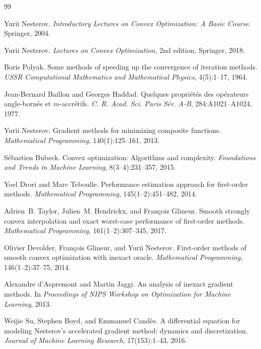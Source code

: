 \documentclass[11pt]{article}
\theoremstyle{plain}
\theoremstyle{remark}
\begin{document}
\begin{thebibliography}{99}

Yurii Nesterov.
\newblock \emph{Introductory Lectures on Convex Optimization: A Basic Course}.
\newblock Springer, 2004.

Yurii Nesterov.
\newblock \emph{Lectures on Convex Optimization}, 2nd edition.
\newblock Springer, 2018.

Boris Polyak.
\newblock Some methods of speeding up the convergence of iteration methods.
\newblock \emph{USSR Computational Mathematics and Mathematical Physics},
  4(5):1--17, 1964.

Jean-Bernard Baillon and Georges Haddad.
\newblock Quelques propri{\'e}t{\'e}s des op{\'e}rateurs angle-born{\'e}s et
  $m$-accr{\'e}tifs.
\newblock \emph{C. R. Acad. Sci. Paris S{\'e}r. A-B}, 284:A1021--A1024, 1977.

Yurii Nesterov.
\newblock Gradient methods for minimizing composite functions.
\newblock \emph{Mathematical Programming}, 140(1):125--161, 2013.

S{\'e}bastien Bubeck.
\newblock Convex optimization: Algorithms and complexity.
\newblock \emph{Foundations and Trends in Machine Learning}, 8(3--4):231--357,
  2015.

Yoel Drori and Marc Teboulle.
\newblock Performance estimation approach for first-order methods.
\newblock \emph{Mathematical Programming}, 145(1--2):451--482, 2014.

Adrien~B. Taylor, Julien~M. Hendrickx, and Fran\c{c}ois Glineur.
\newblock Smooth strongly convex interpolation and exact worst-case performance
  of first-order methods.
\newblock \emph{Mathematical Programming}, 161(1--2):307--345, 2017.

Olivier Devolder, Fran\c{c}ois Glineur, and Yurii Nesterov.
\newblock First-order methods of smooth convex optimization with inexact
  oracle.
\newblock \emph{Mathematical Programming}, 146(1--2):37--75, 2014.

Alexandre d'Aspremont and Martin Jaggi.
\newblock An analysis of inexact gradient methods.
\newblock In \emph{Proceedings of NIPS Workshop on Optimization for Machine
  Learning}, 2013.

Weijie Su, Stephen Boyd, and Emmanuel Cand{\`e}s.
\newblock A differential equation for modeling Nesterov’s accelerated gradient
  method: dynamics and discretization.
\newblock \emph{Journal of Machine Learning Research}, 17(153):1--43, 2016.


\end{thebibliography}
\end{document}

